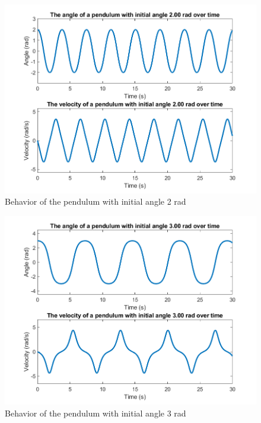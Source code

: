 \documentclass[14pt]{article}
\begin{document}
\begin{figure}[H]
  \includegraphics[width=14cm]{./output/assignment1/2.00_rad.png}
  \caption{Behavior of the pendulum with initial angle 2 rad}
  \label{fig:figure3}
\end{figure}

\begin{figure}[H]
  \includegraphics[width=14cm]{./output/assignment1/3.00_rad.png}
  \caption{Behavior of the pendulum with initial angle 3 rad}
  \label{fig:figure4}
\end{figure}
\end{document}
